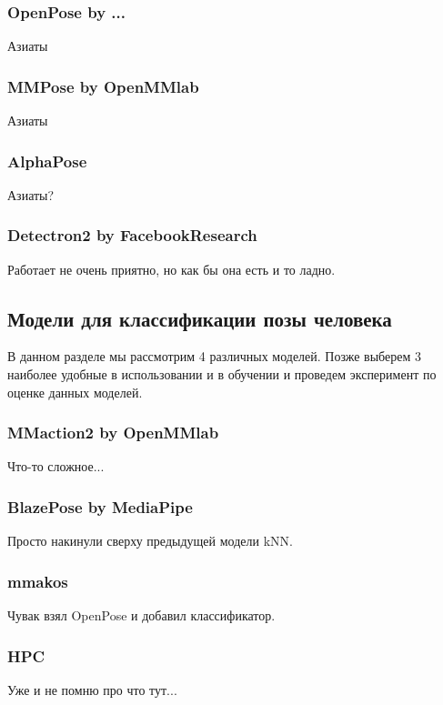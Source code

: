\subsubsection{OpenPose by ...}

Азиаты

\subsubsection{MMPose by OpenMMlab}

Азиаты

\subsubsection{AlphaPose}

Азиаты?

\subsubsection{Detectron2 by FacebookResearch}

Работает не очень приятно, но как бы она есть и то ладно.


\subsection{Модели для классификации позы человека}

В данном разделе мы рассмотрим 4 различных моделей. Позже выберем 3 наиболее удобные в использовании и в обучении и проведем эксперимент по оценке данных моделей.

\subsubsection{MMaction2 by OpenMMlab}

Что-то сложное...

\subsubsection{BlazePose by MediaPipe}

Просто накинули сверху предыдущей модели kNN.

\subsubsection{mmakos}

Чувак взял OpenPose и добавил классификатор.

\subsubsection{HPC}

Уже и не помню про что тут...

\newpage